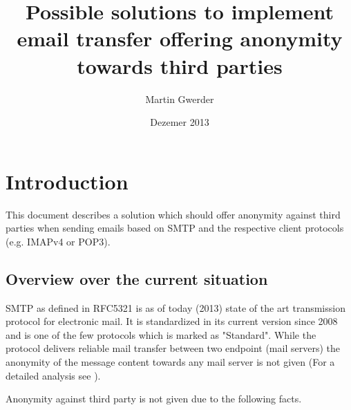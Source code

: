 \documentclass[11pt,a4paper]{book}
\begin{document}
\title{Possible solutions to implement email transfer offering anonymity towards third parties}
\author{Martin Gwerder}
\date{Dezemer 2013}
\maketitle

\begin{comment}
\begin{abstracts}        %
FIXME abstract is still missing
\end{abstracts}

\begin{acknowledgements}      %
FIXME family
FIXME Professor
FIXME university
\\
I would like to acknowledge the thousands of individuals who have coded for the LaTeX project for free. It is due to their efforts that we can generate professionally typeset PDFs now.
\end{acknowledgements}
\end{comment}
\tableofcontents

\chapter{Introduction}
This document describes a solution which should offer anonymity against third parties when sending emails based on SMTP and the respective client protocols (e.g. IMAPv4 or POP3).

\section{Overview over the current situation}
SMTP as defined in RFC5321\cite{RFC5321} is as of today (2013)  state of the art transmission protocol for electronic mail. It is standardized in its current version since 2008 and is one of the few protocols which is marked as "Standard". While the protocol delivers reliable mail transfer between two endpoint (mail servers) the anonymity of the message content towards any mail server is not given (For a detailed analysis see ).\par

Anonymity against third party is not given due to the following facts.
\end{document}
